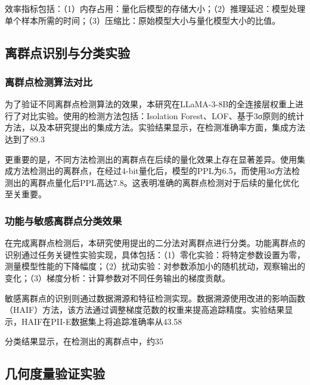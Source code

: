 效率指标包括：（1）内存占用：量化后模型的存储大小；（2）推理延迟：模型处理单个样本所需的时间；（3）压缩比：原始模型大小与量化模型大小的比值。

\subsection{离群点识别与分类实验}

\subsubsection{离群点检测算法对比}

为了验证不同离群点检测算法的效果，本研究在LLaMA-3-8B的全连接层权重上进行了对比实验。使用的检测方法包括：Isolation Forest、LOF、基于3σ原则的统计方法，以及本研究提出的集成方法。实验结果显示，在检测准确率方面，集成方法达到了89.3%

更重要的是，不同方法检测出的离群点在后续的量化效果上存在显著差异。使用集成方法检测出的离群点，在经过4-bit量化后，模型的PPL为6.5，而使用3σ方法检测出的离群点量化后PPL高达7.8。这表明准确的离群点检测对于后续的量化优化至关重要。

\subsubsection{功能与敏感离群点分类效果}

在完成离群点检测后，本研究使用提出的二分法对离群点进行分类。功能离群点的识别通过任务关键性实验实现，具体包括：（1）零化实验：将特定参数设置为零，测量模型性能的下降幅度；（2）扰动实验：对参数添加小的随机扰动，观察输出的变化；（3）梯度分析：计算参数对不同任务输出的梯度贡献。

敏感离群点的识别则通过数据溯源和特征检测实现。数据溯源使用改进的影响函数（HAIF）方法，该方法通过调整梯度范数的权重来提高追踪精度。实验结果显示，HAIF在PII-E数据集上将追踪准确率从43.58%

分类结果显示，在检测出的离群点中，约35%

\subsection{几何度量验证实验}

